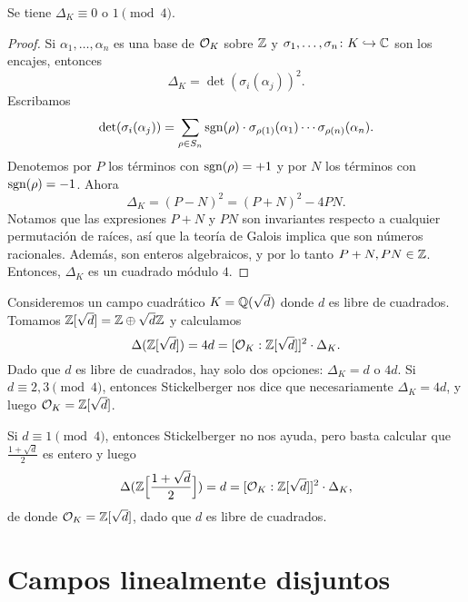 \begin{proposicion}
  Se tiene $\Delta_K \equiv 0 \text{ o }1 \pmod{4}$.

  \begin{proof}
    Si $\alpha_1, \ldots, \alpha_n$ es una base de $\mathcal{O}_K$ sobre $\mathbb{Z}$
    y $\sigma_1, \ldots, \sigma_n\colon K \hookrightarrow \mathbb{C}$ son los encajes,
    entonces
    $$\Delta_K = \det (\sigma_i (\alpha_j))^2.$$
    Escribamos
    \[ \det (\sigma_i (\alpha_j)) =
       \sum_{\rho \in S_n} \operatorname{sgn} (\rho)\cdot\sigma_{\rho (1)} (\alpha_1)\cdots
                                         \sigma_{\rho (n)} (\alpha_n). \]
    Denotemos por $P$ los términos con $\operatorname{sgn} (\rho) = +1$
    y por $N$ los términos con $\operatorname{sgn} (\rho) = -1$. Ahora
    $$\Delta_K = (P-N)^2 = (P+N)^2 - 4PN.$$
    Notamos que las expresiones $P+N$ y $PN$ son invariantes respecto a
    cualquier permutación de raíces, así que la teoría de Galois implica que son
    números racionales. Además, son enteros algebraicos, y por lo tanto
    $P+N, PN \in \mathbb{Z}$. Entonces, $\Delta_K$ es un cuadrado módulo $4$.
  \end{proof}
\end{proposicion}

\begin{ejemplo}
  Consideremos un campo cuadrático $K = \mathbb{Q} (\sqrt{d})$ donde $d$ es libre de
  cuadrados. Tomamos $\mathbb{Z} [\sqrt{d}] = \mathbb{Z} \oplus \sqrt{d}\mathbb{Z}$ y calculamos
  $$\Delta (\mathbb{Z} [\sqrt{d}]) = 4d = [\mathcal{O}_K : \mathbb{Z} [\sqrt{d}]]^2 \cdot \Delta_K.$$
  Dado que $d$ es libre de cuadrados, hay solo dos opciones:
  $\Delta_K = d$ o $4d$. Si $d \equiv 2,3 \pmod{4}$, entonces
  Stickelberger nos dice que necesariamente $\Delta_K = 4d$, y luego
  $\mathcal{O}_K = \mathbb{Z} [\sqrt{d}]$.

  Si $d \equiv 1 \pmod{4}$, entonces Stickelberger no nos ayuda, pero basta
  calcular que $\frac{1 + \sqrt{d}}{2}$ es entero y luego
  \[ \Delta (\mathbb{Z} \Bigl[\frac{1+\sqrt{d}}{2}\Bigr]) = d
     = [\mathcal{O}_K : \mathbb{Z} [\sqrt{d}]]^2 \cdot \Delta_K, \]
  de donde $\mathcal{O}_K = \mathbb{Z} [\sqrt{d}]$, dado que $d$ es libre de cuadrados.
\end{ejemplo}


\section{Campos linealmente disjuntos}

